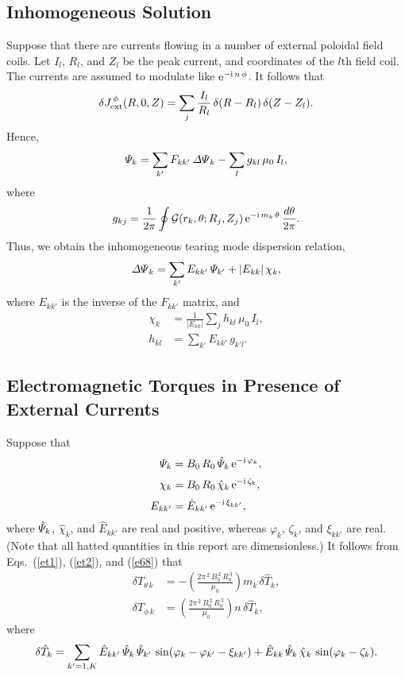 \documentclass[notitlepage,12pt]{article}
\begin{document}
\subsection{Inhomogeneous Solution}
Suppose that there are currents flowing in a number of external poloidal field
coils. Let $I_l$, $R_l$, and $Z_l$ be the peak current, and coordinates of the
$l$th field coil. The currents are assumed to modulate like ${\rm e}^{-{\rm i}\,n\,\phi}$. It follows that
\begin{equation}
\delta J^{\,\phi}_{\rm ext}(R,0,Z)=\sum_j\frac{I_l}{R_l}\,\delta(R-R_l)\,\delta (Z-Z_l).
\end{equation}
Hence,
\begin{equation}
{\mit\Psi}_k = \sum_{k'} F_{kk'}\,{\mit\Delta\Psi}_k - \sum_lg_{kl}\,\mu_0\,I_l,
\end{equation}
where
\begin{equation}
g_{kj} = \frac{1}{2\pi}\oint {\cal G}(r_k,\theta;R_j,Z_j)\,{\rm e}^{-{\rm i}\,m_k\,\theta}\,\frac{d\theta}{2\pi}.
\end{equation}
Thus, we obtain the inhomogeneous tearing mode dispersion relation, 
\begin{equation}
{\mit\Delta\Psi}_k =\sum_{k'} E_{kk'}\,{\mit\Psi}_{k'}+ |E_{kk}|\,\chi_k, \label{e68}
\end{equation}
where $E_{kk'}$ is the inverse of the $F_{kk'}$ matrix, 
and 
\begin{align}
\chi_k&=\frac{1}{|E_{kk}|} \sum_j h_{kl}\,\mu_0\,I_l,\\[0.5ex]
h_{kl} &= \sum_{k'} E_{kk'} \,g_{k'l}. 
\end{align}

\subsection{Electromagnetic Torques in Presence of External Currents}
Suppose that
\begin{align}
{\mit\Psi}_k &= B_0\,R_0\,\hat{\mit\Psi}_k\,{\rm e}^{-{\rm i}\,\varphi_k},\\[0.5ex]
\chi_k &= B_0\,R_0\,\hat{\chi}_{k}\,{\rm e}^{-{\rm i}\,\zeta_k},\\[0.5ex]
E_{kk'} &= \hat{E}_{kk'}\,{\rm e}^{-{\rm i}\,\xi_{kk'}},
\end{align}
where $\hat{\mit\Psi}_k$, $\hat{\chi}_{k}$, and $\hat{E}_{kk'}$
are real and positive, whereas $\varphi_k$, $\zeta_k$, and
$\xi_{kk'}$ are real. 
(Note that all hatted quantities in this report are dimensionless.)
It follows from Eqs.~(\ref{et1}), (\ref{et2}), and (\ref{e68})
that
\begin{align}
\delta T_{\theta\,k} &=-\left(\frac{2\pi^{\,2}\,B_0^{\,2}\,R_0^{\,3}}{\mu_0}\right)m_k\,\delta \hat{T}_k,\\[0.5ex]
\delta T_{\phi\,k}&= \left(\frac{2\pi^{\,2}\,B_0^{\,2}\,R_0^{\,3}}{\mu_0}\right)n\,\delta \hat{T}_k,
\end{align}
where
\begin{equation}
\delta \hat{T}_k= \sum_{k'=1,K}\hat{E}_{kk'}\,\hat{\mit\Psi}_k\,\hat{\mit\Psi}_{k'}\,\sin(\varphi_k-\varphi_{k'}-\xi_{kk'}) + \hat{E}_{kk}\,\hat{\mit\Psi}_k\,\hat{\chi}_{k}\,\sin(\varphi_k-\zeta_k).
\end{equation}
\end{document}
